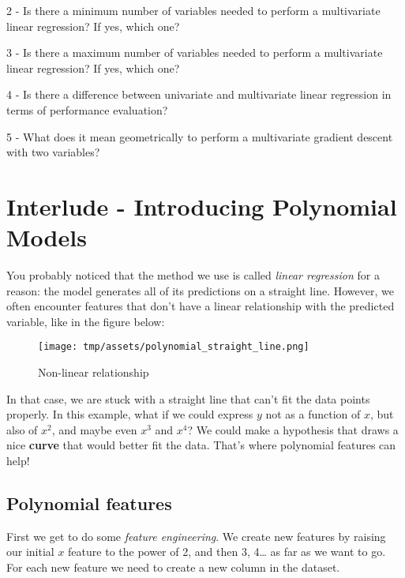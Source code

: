 \documentclass[]{article}
\begin{document}
2 - Is there a minimum number of variables needed to perform a
multivariate linear regression? If yes, which one?

3 - Is there a maximum number of variables needed to perform a
multivariate linear regression? If yes, which one?

4 - Is there a difference between univariate and multivariate linear
regression in terms of performance evaluation?

5 - What does it mean geometrically to perform a multivariate gradient
descent with two variables?

\clearpage

\hypertarget{interlude---introducing-polynomial-models-1}{%
\section{Interlude - Introducing Polynomial
Models}\label{interlude---introducing-polynomial-models-1}}

You probably noticed that the method we use is called \emph{linear
regression} for a reason: the model generates all of its predictions on
a straight line. However, we often encounter features that don't have a
linear relationship with the predicted variable, like in the figure
below:

\begin{figure}
\centering
\texttt{[image: tmp/assets/polynomial\_straight\_line.png]}
\caption{Non-linear relationship}
\end{figure}

In that case, we are stuck with a straight line that can't fit the data
points properly. In this example, what if we could express \(y\) not as
a function of \(x\), but also of \(x^2\), and maybe even \(x^3\) and
\(x^4\)? We could make a hypothesis that draws a nice \textbf{curve}
that would better fit the data. That's where polynomial features can
help!

\hypertarget{polynomial-features}{%
\subsection{Polynomial features}\label{polynomial-features}}

First we get to do some \emph{feature engineering}. We create new
features by raising our initial \(x\) feature to the power of 2, and
then 3, 4\ldots{} as far as we want to go. For each new feature we need
to create a new column in the dataset.
\end{document}
